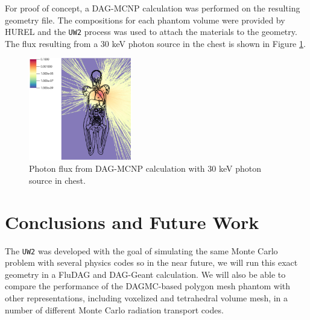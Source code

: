 \documentclass{anstrans}
\begin{document}


For proof of concept, a DAG-MCNP calculation was performed on the resulting geometry file.
The compositions for each phantom volume were provided by HUREL and the \texttt{UW2} 
process was used to attach the materials to the geometry.  The flux resulting from 
a 30 keV photon source in the chest is shown in Figure \ref{fig:mcnp}. 

\begin{figure}[ht] %
  \centering
  \includegraphics[width=0.4\textwidth]{../figs/30KeV_Psource.png}
  \caption{Photon flux from DAG-MCNP calculation with 30 keV photon source in chest. }
  \label{fig:mcnp}
\end{figure}


\section{Conclusions and Future Work}

The \texttt{UW2} was developed with the goal of simulating the same Monte
Carlo problem with several physics codes so in the near future, we will run
this exact geometry in a FluDAG and DAG-Geant calculation. We will also be
able to compare the performance of the DAGMC-based polygon mesh phantom with
other representations, including voxelized and tetrahedral volume mesh, in a
number of different Monte Carlo radiation transport codes.

\end{document}
